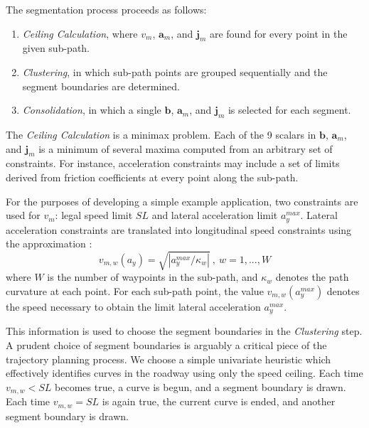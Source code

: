 \documentclass[letterpaper, 10 pt, conference]{ieeeconf}  %
\begin{document}
The segmentation process proceeds as follows:
\begin{enumerate} \label{asdf}
  \item \emph{Ceiling Calculation}, where $v_m$, $\mathbf{a}_m$, and $\mathbf{j}_m$ 
are found for every point in the given sub-path.
  \item \emph{Clustering}, in which sub-path points are grouped sequentially and the segment boundaries are determined.
  \item \emph{Consolidation}, in which a single $\mathbf{b}$, $\mathbf{a}_m$, and $\mathbf{j}_m$ is selected for each segment.
\end{enumerate}

The {\it Ceiling Calculation} is a minimax problem.
Each of the 9 scalars in $\mathbf{b}$, $\mathbf{a}_m$, and $\mathbf{j}_m$ is a minimum of several maxima computed from an arbitrary set of constraints.
For instance, acceleration constraints may include a set of limits derived from friction coefficients at every point along the sub-path.

For the purposes of developing a simple example application, two constraints are used for $v_{m}$: legal speed limit $SL$ and lateral acceleration limit $a_{y}^{max}$. 
Lateral acceleration constraints are translated into longitudinal speed constraints using the approximation :
\begin{equation}
  v_{m,w}(a_{y}) = \sqrt{ | a_{y}^{max} / \kappa_{w} | } ~,~ w = 1, ..., W
\end{equation}
where $W$ is the number of waypoints in the sub-path, and $\kappa_{w}$ denotes the path curvature at each point.
For each sub-path point, the value $v_{m,w}(a_{y}^{max})$ denotes the speed necessary to obtain the limit lateral acceleration $a^{max}_{y}$.

This information is used to choose the segment boundaries in the {\it Clustering} step.
A prudent choice of segment boundaries is arguably a critical piece of the trajectory planning process.
We choose a simple univariate heuristic which effectively identifies curves in the roadway using only the speed ceiling.
Each time $v_{m,w} < SL$ becomes true, a curve is begun, and a segment boundary is drawn.
Each time $v_{m,w} = SL$ is again true, the current curve is ended, and another segment boundary is drawn.
\end{document}
